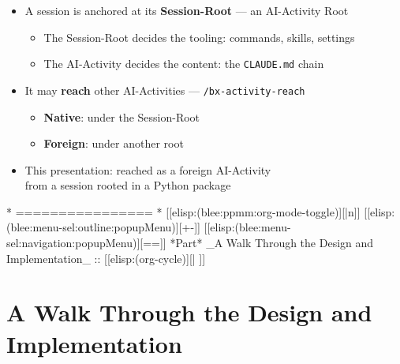 \begin{whenOrg}
\begin{verblatex}
\begin{frame}[fragile,plain,label=sessionActivities]
\begin{itemize}
  \item A session is anchored at its \textbf{Session-Root} --- an AI-Activity Root
    \begin{itemize}
    \item The Session-Root decides the tooling: commands, skills, settings
    \item The AI-Activity decides the content: the \texttt{CLAUDE.md} chain
    \end{itemize}
  \item It may \textbf{reach} other AI-Activities --- \texttt{/bx-activity-reach}
    \begin{itemize}
    \item \textbf{Native}: under the Session-Root
    \item \textbf{Foreign}: under another root
    \end{itemize}
  \item This presentation: reached as a foreign AI-Activity\\
    from a session rooted in a Python package
  \end{itemize}


\end{frame}
\end{verblatex}



\begin{whenOrg}
*      ================
*  [[elisp:(blee:ppmm:org-mode-toggle)][|n]] [[elisp:(blee:menu-sel:outline:popupMenu)][+-]] [[elisp:(blee:menu-sel:navigation:popupMenu)][==]]  *Part*   _A Walk Through the Design and Implementation_ ::  [[elisp:(org-cycle)][| ]]
\end{whenOrg}

\newpage
\part{A Walk Through the Design and Implementation}


\end{whenOrg}
